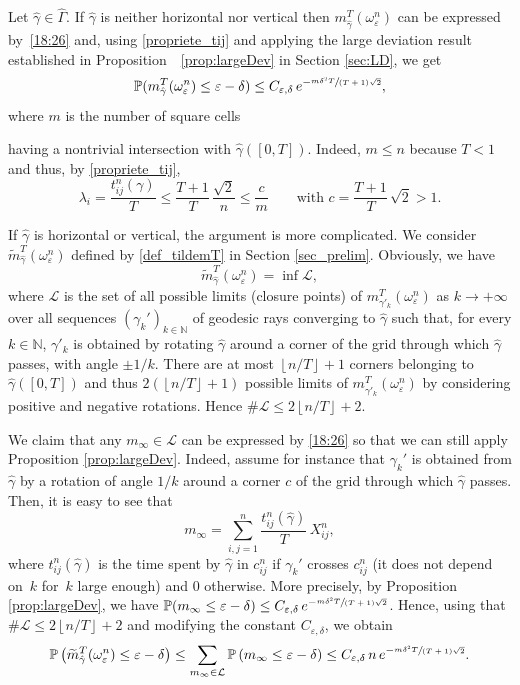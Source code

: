 \documentclass[JEP,XML,SOM,Unicode, NoEqCountersInSection,NoFloatCountersInSection,published]{cedram}
\def\N{\mathbb{N}}
\theoremstyle{definition}
\begin{document}
Let $\hat \gamma\in\hat \Gamma$.
{If $\hat \gamma$ is neither horizontal nor vertical then $m_{\hat \gamma}^T(\omega_\varepsilon^n) $ can be expressed by~\eqref{18:26} and, using \eqref{propriete_tij} and} applying the large deviation result established in Proposition~ \ref{prop:largeDev} in Section \ref{sec:LD}, we get
\[
\mathbb{P}( m_{\hat \gamma}^T(\omega_\varepsilon^n) \leq \varepsilon-\delta) \leq C_{\varepsilon, \delta} \, {e^{-\sfrac{m \delta^2 T}{(T+1)\sqrt{2}}} },
\]
where $m$ is the number of square cells {having a nontrivial intersection with $\hat \gamma([0,T])$. Indeed, $m\leq n$ because $T<1$ and thus, by \eqref{propriete_tij},
\[
\lambda_i = \frac{t_{ij}^n(\gamma)}{T} \leq \frac{T+1}{T}\,\frac{\sqrt{2}}{n} \leq \frac{c}{m}\qquad\text{with }c=\frac{T+1}{T}\,\sqrt{2} > 1.
\]

If $\hat \gamma$ is horizontal or vertical, the argument is more complicated.
We consider $\widetilde m^T_{\hat \gamma}(\omega_\varepsilon^n)$ defined by \eqref{def_tildemT} in Section \ref{sec_prelim}. Obviously, we have
\[
\widetilde m^T_{\hat \gamma}(\omega_\varepsilon^n) = \inf \mathcal{L},
\]
where $\mathcal{L}$ is the set of all possible limits (closure points) of $m^T_{\gamma'_k}(\omega_\varepsilon^n)$ as $k\rightarrow+\infty$ over all sequences $(\gamma_k')_{k\in \N}$ of geodesic rays converging to $\hat \gamma$ such that, for every $k\in\N$, $\gamma'_k$ is obtained by rotating $\hat \gamma$ around a corner of the grid through which $\hat \gamma$ passes, with angle $\pm 1/k$.
There are at most $\left \lfloor n/T\right \rfloor +1$ corners belonging to $\hat \gamma([0,T])$ and thus $2(\left \lfloor n/T\right \rfloor+1)$ possible limits of $m^T_{\gamma'_k}(\omega_\varepsilon^n)$ by considering positive and negative rotations. Hence $\#\mathcal{L} \leq 2\left \lfloor n/T\right \rfloor+2$.

We claim that any $m_\infty\in\mathcal{L}$ can be expressed by \eqref{18:26} so that we can still apply Proposition \ref{prop:largeDev}. Indeed, assume for instance that $\gamma_k'$ is obtained from $\hat \gamma$ by a rotation of angle $1/k$ around a corner $c$ of the grid through which $\hat \gamma$ passes.
Then, it is easy to see that
\[
m_\infty = \sum_{i,j=1}^n \frac{t_{ij}^n(\hat \gamma)}{T}\, X_{ij}^n,
\]
where $t_{ij}^n(\hat \gamma)$ is the time spent by $\hat\gamma$ in $c_{ij}^n$ if $\gamma_k'$ crosses $c_{ij}^n$ (it does not depend on~$k$ for~$k$ large enough) and $0$ otherwise. More precisely, by Proposition \ref{prop:largeDev}, we have
\hbox{$\mathbb{P}( m_\infty \leq \varepsilon-\delta) \leq C_{\varepsilon, \delta} \, {e^{-\sfrac{m \delta^2 T}{(T+1)\sqrt{2}}}}$}.
Hence, using that $\#\mathcal{L} \leq 2\left \lfloor n/T\right \rfloor+2$ and modifying the constant $ C_{\varepsilon, \delta}$, we obtain
\[
\mathbb{P}\left( \widetilde m_{\hat \gamma}^T(\omega_\varepsilon^n ) \leq \varepsilon-\delta \right)
\leq \sum_{m_\infty \in \mathcal{L}} \mathbb{P}\left(m_\infty \leq \varepsilon-\delta \right) \leq C_{\varepsilon, \delta} \, n \, {e^{-\sfrac{m \delta^2 T}{(T+1)\sqrt{2}}} }.
\]

}
\end{document}
